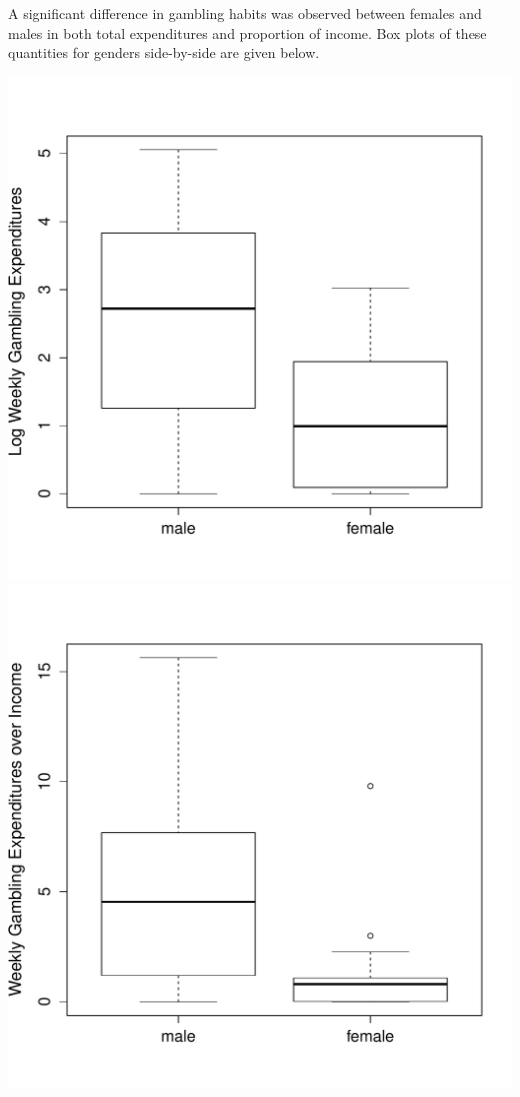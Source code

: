 \documentclass{homework}
\begin{document}
\begin{solution}
  A significant difference in gambling habits was observed between females and
  males in both total expenditures and proportion of income.  Box plots of these
  quantities for genders side-by-side are given below. 

  \includegraphics[width=.45\textwidth]{log_expend.pdf}
  \includegraphics[width=.45\textwidth]{log_proportion.pdf}
  \end{solution}

  
\end{document}
